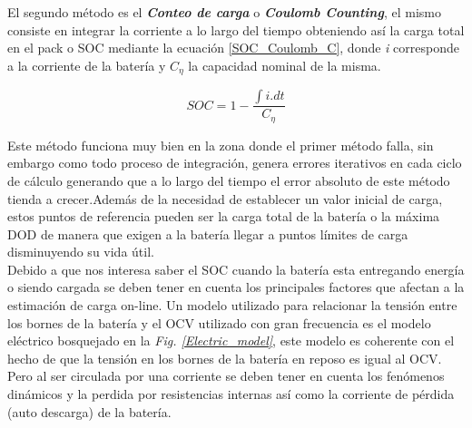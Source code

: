 \documentclass[10pt,a4paper]{article}
\begin{document}
	El segundo método es el \textbf{\emph{Conteo de carga}} o \textbf{\emph{Coulomb Counting}}, el mismo consiste en integrar la corriente a lo largo del tiempo obteniendo así la carga total en el pack o SOC mediante la ecuación \ref{SOC_Coulomb_C}, donde \emph{i} corresponde a la corriente de la batería y $C_\eta$ la capacidad nominal de la misma.\\
	
	\begin{figure}[h!]
		\begin{center}
			\begin{equation}
				SOC=1-\frac{\int{i.dt}}{C_\eta}\label{SOC_Coulomb_C}
			\end{equation}	
		\end{center}
	\end{figure}
	
	Este método funciona muy bien en la zona donde el primer método falla, sin embargo como todo proceso de integración, genera errores iterativos en cada ciclo de cálculo generando que a lo largo del tiempo el error absoluto de este método tienda a crecer.Además de la necesidad de establecer un valor inicial de carga, estos puntos de referencia pueden ser la carga total de la batería o la máxima DOD de manera que exigen a la batería llegar a puntos límites de carga disminuyendo su vida útil.\\
	
	Debido a que nos interesa saber el SOC cuando la batería esta entregando energía o siendo cargada se deben tener en cuenta los principales factores que afectan a la estimación de carga on-line. Un modelo utilizado para relacionar la tensión entre los bornes de la batería y el OCV utilizado con gran frecuencia es el modelo eléctrico bosquejado en la \emph{Fig. \ref{Electric_model}}, este modelo es coherente con el hecho de que la tensión en los bornes de la batería en reposo es igual al OCV. Pero al ser circulada por una corriente se deben tener en cuenta los fenómenos dinámicos  y la perdida por resistencias internas así como la corriente de pérdida (auto descarga) de la batería.
	
\end{document}
